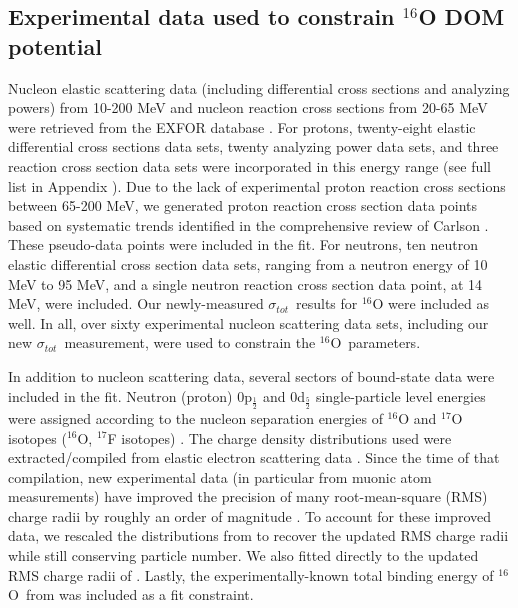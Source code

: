 \documentclass[twocolumn,secnumarabic,amssymb, nobibnotes, aps, prl,
superscriptaddress, nobalancelastpage]{revtex4}
\newcommand{\tot}{\ensuremath{\sigma_{tot}}}
\newcommand{\oSix}{\ensuremath{^{16}}O}
\begin{document}
\subsection{Experimental data used to constrain $^{16}$O DOM potential}
Nucleon elastic scattering data (including differential cross sections and analyzing
powers) from 10-200 MeV and nucleon reaction cross sections from 20-65 MeV
were retrieved from the EXFOR database \cite{EXFORDatabase}.
For protons, twenty-eight elastic differential cross
sections data sets, twenty analyzing power data sets,
and three reaction cross section data sets were
incorporated in this energy range (see full list in Appendix
\cite{DataReferences}). Due to the lack of experimental proton
reaction cross sections between 65-200 MeV, we generated proton reaction cross
section data points based on systematic trends identified in the comprehensive
review of Carlson \cite{Carlson1996}. These pseudo-data points were included in the fit.
For neutrons, ten neutron elastic differential cross section
data sets, ranging from a neutron energy of 10 MeV to 95 MeV, and a single
neutron reaction cross section data point, at 14 MeV, were included. 
Our newly-measured \tot\ results for $^{16}$O were included as well. In all,
over sixty experimental nucleon scattering data sets, including our new \tot\ 
measurement, were used to constrain the \oSix\ parameters.

In addition to nucleon scattering data, several sectors of bound-state data were
included in the fit. Neutron (proton) 0p$_{\frac{1}{2}}$ and 0d$_{\frac{5}{2}}$
single-particle level energies were
assigned according to the nucleon separation energies of $^{16}$O and
$^{17}$O isotopes ($^{16}$O, $^{17}$F isotopes) \cite{AME2016}.
The charge density distributions used were extracted/compiled from elastic
electron scattering data \cite{DeVries1987}. Since the time of that compilation,
new experimental data (in particular from muonic atom measurements) have improved the precision
of many root-mean-square (RMS) charge radii by roughly an order of magnitude \cite{Angeli2013}.
To account for these improved data, we rescaled the distributions from
\cite{DeVries1987} to recover the updated
RMS charge radii while still conserving particle number. We also fitted directly
to the updated RMS charge radii of \cite{Angeli2013}.
Lastly, the experimentally-known total binding energy of \oSix\ from \cite{AME2016} was
included as a fit constraint. 
\end{document}
